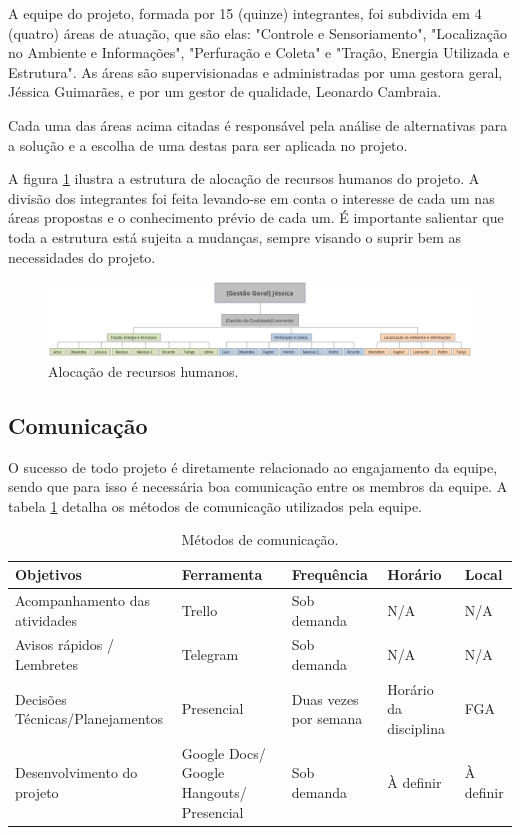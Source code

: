 A equipe do projeto, formada por 15 (quinze) integrantes, foi
subdivida em 4 (quatro) áreas de atuação, que são elas: "Controle
e Sensoriamento", "Localização no Ambiente e Informações", "Perfuração
e Coleta" e "Tração, Energia Utilizada e Estrutura". As áreas são
supervisionadas e administradas por uma gestora geral, Jéssica Guimarães,
e por um gestor de qualidade, Leonardo Cambraia.

Cada uma das áreas acima citadas é responsável pela análise de alternativas
para a solução e a escolha de uma destas para ser aplicada no projeto.

A figura \ref{fig:aloc} ilustra a estrutura de alocação de recursos humanos do
projeto. A divisão dos integrantes foi feita levando-se em conta o
interesse de cada um nas áreas propostas e o conhecimento prévio de
cada um. É importante salientar que toda a estrutura está sujeita a
mudanças, sempre visando o suprir bem as necessidades do projeto.

\begin{figure}[!htbp]
\begin{center}
\includegraphics[width=\textwidth]{figuras/alocacao.eps}
\caption{\label{fig:aloc}Alocação de recursos humanos.}
\end{center}
\end{figure}

    \subsection{Comunicação}

O sucesso de todo projeto é diretamente relacionado ao engajamento
da equipe, sendo que para isso é necessária boa comunicação entre os
membros da equipe. A tabela \ref{tab:com} detalha os métodos de comunicação
utilizados pela equipe.

\begin{table}[!htbp]
\begin{center}
\begin{tabular}{|p{4cm}|p{4cm}|p{3cm}|p{3cm}|p{2cm}|}
\hline
\textbf{Objetivos} & \textbf{Ferramenta} & \textbf{Frequência} & \textbf{Horário} & \textbf{Local}\\\hline
Acompanhamento das atividades & Trello & Sob demanda & N/A & N/A\\\hline
Avisos rápidos / Lembretes & Telegram & Sob demanda & N/A & N/A\\\hline
Decisões Técnicas/Planejamentos & Presencial & Duas vezes por semana & Horário da disciplina & FGA\\\hline
Desenvolvimento do projeto & Google Docs/ Google Hangouts/ Presencial & Sob demanda & À definir & À definir\\\hline
\end{tabular}
\caption{\label{tab:com}Métodos de comunicação.}
\end{center}
\end{table}

